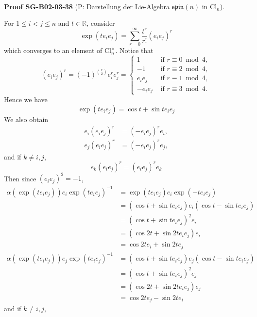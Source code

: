 \documentclass[10pt, letterpaper]{article}
\newcommand{\Cl}{\mathrm{Cl}}
\newcommand{\CustomHeading}[3]{%
  \par\medskip\noindent%
  \textbf{#1 #2} \textnormal{(#3)}.\enskip%
}
\newenvironment{PROOF}[2]{\begin{unitbox}\CustomHeading{Proof}{#1}{#2}}{\end{unitbox}}
\begin{document}
\begin{PROOF}{SG-B02-03-38}{P: Darstellung der Lie-Algebra \(\mathfrak{spin}(n)\) in \(\Cl_n\)}
For $1 \leqslant i<j \leqslant n$ and $t \in \mathbb{R}$, consider
$$
\exp \left(t e_{i} e_{j}\right)=\sum_{r=0}^{\infty} \frac{t^{r}}{r!}\left(e_{i} e_{j}\right)^{r}
$$
which converges to an element of $\mathrm{Cl}_{n}^{\times}$. Notice that
$$
\left(e_{i} e_{j}\right)^{r}=(-1)^{\binom{r}{2}} e_{i}^{r} e_{j}^{r}=\left\{\begin{array}{cl}
1 & \text { if } r \equiv 0 \bmod 4, \\
-1 & \text { if } r \equiv 2 \bmod 4, \\
e_{i} e_{j} & \text { if } r \equiv 1 \bmod 4, \\
-e_{i} e_{j} & \text { if } r \equiv 3 \bmod 4 .
\end{array}\right.
$$
Hence we have
$$
\exp \left(t e_{i} e_{j}\right)=\cos t+\sin t e_{i} e_{j}
$$
We also obtain
$$
\begin{aligned}
e_{i}\left(e_{i} e_{j}\right)^{r} & =\left(-e_{i} e_{j}\right)^{r} e_{i}, \\
e_{j}\left(e_{i} e_{j}\right)^{r} & =\left(-e_{i} e_{j}\right)^{r} e_{j},
\end{aligned}
$$
and if $k \neq i, j$,
$$
e_{k}\left(e_{i} e_{j}\right)^{r}=\left(e_{i} e_{j}\right)^{r} e_{k}
$$
Then since $\left(e_{i} e_{j}\right)^{2}=-1$,
$$
\begin{aligned}
\alpha\left(\exp \left(t e_{i} e_{j}\right)\right) e_{i} \exp \left(t e_{i} e_{j}\right)^{-1} & =\exp \left(t e_{i} e_{j}\right) e_{i} \exp \left(-t e_{i} e_{j}\right) \\
& =\left(\cos t+\sin t e_{i} e_{j}\right) e_{i}\left(\cos t-\sin t e_{i} e_{j}\right) \\
& =\left(\cos t+\sin t e_{i} e_{j}\right)^{2} e_{i} \\
& =\left(\cos 2 t+\sin 2 t e_{i} e_{j}\right) e_{i} \\
& =\cos 2 t e_{i}+\sin 2 t e_{j} \\
\alpha\left(\exp \left(t e_{i} e_{j}\right)\right) e_{j} \exp \left(t e_{i} e_{j}\right)^{-1} & =\left(\cos t+\sin t e_{i} e_{j}\right) e_{j}\left(\cos t-\sin t e_{i} e_{j}\right) \\
& =\left(\cos t+\sin t e_{i} e_{j}\right)^{2} e_{j} \\
& =\left(\cos 2 t+\sin 2 t e_{i} e_{j}\right) e_{j} \\
& =\cos 2 t e_{j}-\sin 2 t e_{i}
\end{aligned}
$$
and if $k \neq i, j$,

\end{PROOF}
\end{document}
